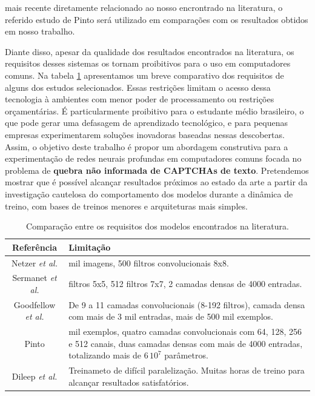 mais recente diretamente relacionado ao nosso encrontrado na literatura, o referido estudo de Pinto será utilizado em comparações com os resultados obtidos em nosso trabalho.

Diante disso, apesar da qualidade dos resultados encontrados na literatura, os requisitos desses sistemas os tornam proibitivos para o uso em computadores comuns. Na tabela \ref{tableredes} apresentamos um breve comparativo dos requisitos de alguns dos estudos selecionados. Essas restrições limitam o acesso dessa tecnologia à ambientes com menor poder de processamento ou restrições orçamentárias. É particularmente proibitivo para o estudante médio brasileiro, o que pode gerar uma defasagem de aprendizado tecnológico, e para pequenas empresas experimentarem soluções inovadoras baseadas nessas descobertas. Assim, o objetivo deste trabalho é propor um abordagem construtiva para a experimentação de redes neurais profundas em computadores comuns focada no problema de \textbf{quebra não informada de CAPTCHAs de texto}. Pretendemos mostrar que é possível alcançar resultados próximos ao estado da arte a partir da investigação cautelosa do comportamento dos modelos durante a dinâmica de treino, com bases de treinos menores e arquiteturas mais simples. 


\begin{table}[ht]
\begin{center}
	\caption{Comparação entre os requisitos dos modelos encontrados na literatura.}
	\begin{tabular}{ c | >{\centering\arraybackslash}m{7cm}  }
		Referência & Limitação  \\ %
		\hline \hline  
		Netzer \textit{et al.}     \cite{netzer2011reading}         &  600 mil imagens, 500 filtros convolucionais 8x8.  \\ \hline
		Sermanet \textit{et al.}   \cite{sermanet2012convolutional} &  16 filtros 5x5, 512 filtros 7x7, 2 camadas densas de 4000 entradas. \\ \hline
		Goodfellow \textit{et al.} \cite{captcha_break_2013}        &  De 9 a 11 camadas convolucionais (8-192 filtros), camada densa com mais de 3 mil entradas, mais de 500 mil exemplos.   \\ \hline
		Pinto \cite{otaro}											& 180 mil exemplos, quatro camadas convolucionais com 64, 128, 256 e 512 canais, duas camadas densas com mais de 4000 entradas, totalizando mais de $6 \, 10^{7}$ parâmetros.\\ \hline
		Dileep \textit{et al.} \cite{captcha_break_2017}			& Treinameto de difícil paralelização. Muitas horas de treino para alcançar resultados satisfatórios.\\ \hline
\end{tabular}
	\label{tableredes}
\end{center}
\end{table}
